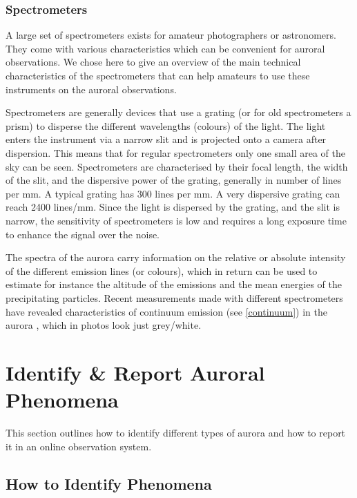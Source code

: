 \documentclass{article}
\renewcommand{\cite}[1]{\parencite{#1}}
\begin{document}
\subsubsection{Spectrometers}
A large set of spectrometers exists for amateur photographers or astronomers. They come with various characteristics which can be convenient for auroral observations. We chose here to give an overview of the main technical characteristics of the spectrometers that can help amateurs to use these instruments on the auroral observations.

Spectrometers are generally devices that use a grating (or for old spectrometers a prism) to disperse the different wavelengths (colours) of the light. The light enters the instrument via a narrow slit and is projected onto a camera after dispersion. This means that for regular spectrometers only one small area of the sky can be seen. 
Spectrometers are characterised by their focal length, the width of the slit, and the dispersive power of the grating, generally in number of lines per mm. A typical grating has 300 lines per mm. A very dispersive grating can reach 2400 lines/mm. Since the light is dispersed by the grating, and the slit is narrow, the sensitivity of spectrometers is low and requires a long exposure time to enhance the signal over the noise.

The spectra of the aurora carry information on the relative or absolute intensity of the different emission lines (or colours), which in return can be used to estimate for instance the altitude of the emissions and the mean energies of the precipitating particles. Recent measurements made with different spectrometers have revealed characteristics of continuum emission (see \ref{continuum}) in the aurora \cite{Gillies2019}, which in photos look just grey/white.



\section{Identify \& Report Auroral Phenomena}
This section outlines how to identify different types of aurora and how to report it in an online observation system.

\subsection{How to Identify Phenomena} \
\end{document}
